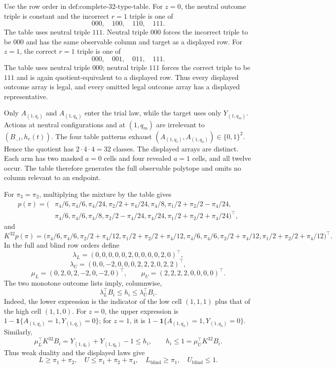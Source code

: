 Use the row order in \(\text{def:complete-32-type-table}\).  For \(z=0\), the neutral outcome triple is constant and the incorrect \(r=1\) triple is one of
\[
000,\quad100,\quad110,\quad111.
\]
The table uses neutral triple \(111\).  Neutral triple \(000\) forces the incorrect triple to be \(000\) and has the same observable column and target as a displayed row.  For \(z=1\), the correct \(r=1\) triple is one of
\[
000,\quad001,\quad011,\quad111.
\]
The table uses neutral triple \(000\); neutral triple \(111\) forces the correct triple to be \(111\) and is again quotient-equivalent to a displayed row.  Thus every displayed outcome array is legal, and every omitted legal outcome array has a displayed representative.

Only \(A_{(1,q_\ell)}\) and \(A_{(1,q_h)}\) enter the trial law, while the target uses only \(Y_{(1,q_m)}\).  Actions at neutral configurations and at \((1,q_m)\) are irrelevant to \((B_{\cdot,t},h_e(t))\).  The four table patterns exhaust \((A_{(1,q_\ell)},A_{(1,q_h)})\in\{0,1\}^2\).  Hence the quotient has \(2\cdot4\cdot4=32\) classes.  The displayed arrays are distinct.  Each arm has two masked \(a=0\) cells and four revealed \(a=1\) cells, and all twelve occur.  The table therefore generates the full observable polytope and omits no column relevant to an endpoint.

For \(\pi_3=\pi_2\), multiplying the mixture by the table gives
\[
\begin{split}
p(\pi)=\bigl(&\pi_4/6,\pi_4/6,\pi_4/24,\pi_2/2+\pi_4/24,\pi_4/8,
\pi_1/2+\pi_2/2-\pi_4/24,\\
&\pi_4/6,\pi_4/6,\pi_4/8,\pi_2/2-\pi_4/24,\pi_4/24,
\pi_1/2+\pi_2/2+\pi_4/24\bigr)^{\top},
\end{split}
\]
and
\[
K^{32}p(\pi)=\bigl(\pi_4/6,\pi_4/6,\pi_2/2+\pi_4/12,
\pi_1/2+\pi_2/2+\pi_4/12,\pi_4/6,\pi_4/6,
\pi_2/2+\pi_4/12,\pi_1/2+\pi_2/2+\pi_4/12\bigr)^{\top}.
\]
In the full and blind row orders define
\[
\lambda_L=(0,0,0,0,0,2,0,0,0,0,2,0)^{\top},
\]
\[
\lambda_U=(0,0,-2,0,0,0,2,2,2,0,2,2)^{\top},
\]
\[
\mu_L=(0,2,0,2,-2,0,-2,0)^{\top},\qquad
\mu_U=(2,2,2,2,0,0,0,0)^{\top}.
\]
The two monotone outcome lists imply, columnwise,
\[
\lambda_L^{\top}B_i\leq h_i\leq\lambda_U^{\top}B_i.
\]
Indeed, the lower expression is the indicator of the low cell \((1,1,1)\) plus that of the high cell \((1,1,0)\).  For \(z=0\), the upper expression is \(1-\mathbf 1\{A_{(1,q_\ell)}=1,Y_{(1,q_\ell)}=0\}\); for \(z=1\), it is \(1-\mathbf 1\{A_{(1,q_h)}=1,Y_{(1,q_h)}=0\}\).  Similarly,
\[
\mu_L^{\top}K^{32}B_i
=Y_{(1,q_\ell)}+Y_{(1,q_h)}-1\leq h_i,\qquad
h_i\leq1=\mu_U^{\top}K^{32}B_i.
\]
Thus weak duality and the displayed laws give
\[
L\geq\pi_1+\pi_2,\quad U\leq\pi_1+\pi_2+\pi_4,\quad
L_{\mathrm{blind}}\geq\pi_1,\quad U_{\mathrm{blind}}\leq1.
\]

